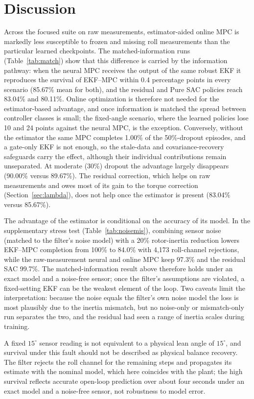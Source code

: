 \documentclass[preprint,12pt,authoryear=false]{elsarticle}
\theoremstyle{remark}\newtheorem{remark}{Remark}
\theoremstyle{plain}\newtheorem{proposition}{Proposition}\newtheorem{lemma}{Lemma}
\theoremstyle{definition}\newtheorem{assumption}{Assumption}
\begin{document}
\section{Discussion}
Across the focused suite on raw measurements, estimator-aided online MPC is markedly less susceptible to frozen and missing roll measurements than the particular learned checkpoints. The matched-information runs (Table~\ref{tab:match}) show that this difference is carried by the information pathway: when the neural MPC receives the output of the same robust EKF it reproduces the survival of EKF--MPC within 0.4 percentage points in every scenario (85.67\% mean for both), and the residual and Pure SAC policies reach 83.04\% and 80.11\%. Online optimization is therefore not needed for the estimator-based advantage, and once information is matched the spread between controller classes is small; the fixed-angle scenario, where the learned policies lose 10 and 24 points against the neural MPC, is the exception. Conversely, without the estimator the same MPC completes 1.00\% of the 50\%-dropout episodes, and a gate-only EKF is not enough, so the stale-data and covariance-recovery safeguards carry the effect, although their individual contributions remain unseparated. At moderate (30\%) dropout the advantage largely disappears (90.00\% versus 89.67\%). The residual correction, which helps on raw measurements and owes most of its gain to the torque correction (Section~\ref{sec:lambda}), does not help once the estimator is present (83.04\% versus 85.67\%).

The advantage of the estimator is conditional on the accuracy of its model. In the supplementary stress test (Table~\ref{tab:noisemis}), combining sensor noise (matched to the filter's noise model) with a 20\% rotor-inertia reduction lowers EKF--MPC completion from 100\% to 84.0\% with 4{,}173 roll-channel rejections, while the raw-measurement neural and online MPC keep 97.3\% and the residual SAC 99.7\%. The matched-information result above therefore holds under an exact model and a noise-free sensor; once the filter's assumptions are violated, a fixed-setting EKF can be the weakest element of the loop. Two caveats limit the interpretation: because the noise equals the filter's own noise model the loss is most plausibly due to the inertia mismatch, but no noise-only or mismatch-only run separates the two, and the residual had seen a range of inertia scales during training.


A fixed $15^\circ$ sensor reading is not equivalent to a physical lean angle of $15^\circ$, and survival under this fault should not be described as physical balance recovery. The filter rejects the roll channel for the remaining steps and propagates its estimate with the nominal model, which here coincides with the plant; the high survival reflects accurate open-loop prediction over about four seconds under an exact model and a noise-free sensor, not robustness to model error.
\end{document}
